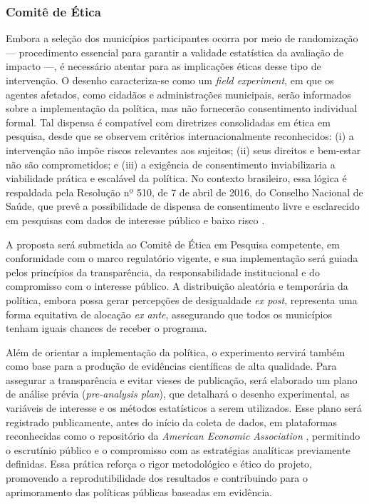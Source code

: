 \subsubsection{Comitê de Ética}

Embora a seleção dos municípios participantes ocorra por meio de randomização — procedimento essencial para garantir a validade estatística da avaliação de impacto —, é necessário atentar para as implicações éticas desse tipo de intervenção. O desenho caracteriza-se como um \textit{field experiment}, em que os agentes afetados, como cidadãos e administrações municipais, serão informados sobre a implementação da política, mas não fornecerão consentimento individual formal. Tal dispensa é compatível com diretrizes consolidadas em ética em pesquisa, desde que se observem critérios internacionalmente reconhecidos: (i) a intervenção não impõe riscos relevantes aos sujeitos; (ii) seus direitos e bem-estar não são comprometidos; e (iii) a exigência de consentimento inviabilizaria a viabilidade prática e escalável da política. No contexto brasileiro, essa lógica é respaldada pela Resolução nº 510, de 7 de abril de 2016, do Conselho Nacional de Saúde, que prevê a possibilidade de dispensa de consentimento livre e esclarecido em pesquisas com dados de interesse público e baixo risco \cite{CNS_2016}.

A proposta será submetida ao Comitê de Ética em Pesquisa competente, em conformidade com o marco regulatório vigente, e sua implementação será guiada pelos princípios da transparência, da responsabilidade institucional e do compromisso com o interesse público. A distribuição aleatória e temporária da política, embora possa gerar percepções de desigualdade \textit{ex post}, representa uma forma equitativa de alocação \textit{ex ante}, assegurando que todos os municípios tenham iguais chances de receber o programa.

Além de orientar a implementação da política, o experimento servirá também como base para a produção de evidências científicas de alta qualidade. Para assegurar a transparência e evitar vieses de publicação, será elaborado um plano de análise prévia (\textit{pre-analysis plan}), que detalhará o desenho experimental, as variáveis de interesse e os métodos estatísticos a serem utilizados. Esse plano será registrado publicamente, antes do início da coleta de dados, em plataformas reconhecidas como o repositório da\textit{ American Economic Association} \cite{AEA_registry}, permitindo o escrutínio público e o compromisso com as estratégias analíticas previamente definidas. Essa prática reforça o rigor metodológico e ético do projeto, promovendo a reprodutibilidade dos resultados e contribuindo para o aprimoramento das políticas públicas baseadas em evidência.

